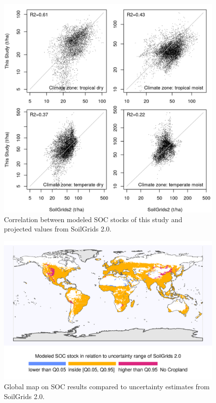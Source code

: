 \documentclass[gc, manuscript]{copernicus}
\begin{document}
\begin{figure}[h]
\includegraphics[width=13cm]{../ResultNotebooks/Output/Images/scatterCompareSoilGrids2_2010_lu} \caption{Correlation between modeled SOC stocks of this study and projected values from SoilGrids 2.0.}\label{fig:SOCSoilGrids2}
\end{figure}

\begin{figure}[h]
\includegraphics[width=14cm]{../ResultNotebooks/Output/Images/SOCquantilesSoilGrids2} \caption{Global map on SOC results compared to uncertainty estimates from SoilGrids 2.0.}\label{fig:SOCSoilGrids2Q}
\end{figure}
\end{document}
